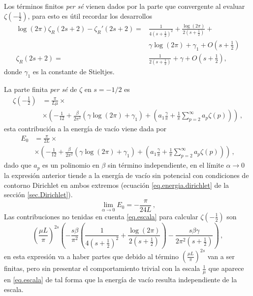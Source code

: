 Los términos finitos {\it per sé} vienen dados por la parte que convergente al evaluar $\zeta (-\frac{1}{2} )$, para esto es útil recordar los desarrollos
\begin{align}\label{cortar}
	\log (2 \pi) \zeta _R (2s+2) -
	\zeta _R ' (2s+2) = & 
	\frac{1}{4 \left( s + \frac{1}{2} \right) ^2} + 
	\frac{ \log (2 \pi ) }{2 \left( s + \frac{1}{2} \right) } + \\
	& \gamma \log (2 \pi ) + \gamma _1 + O \left( s + \frac{1}{2} \right) \\
	\zeta _R (2s+2) = &\frac{1}{2 \left( s + \frac{1}{2} \right)} + \gamma + O \left( s + \frac{1}{2} \right)
	 ,
\end{align}
donde $\gamma _1$ es la constante de Stieltjes.


La parte finita {\it per sé}  de $\zeta$ en $s=-1/2$ es 
\begin{align}\label{eq.escala}
 \zeta \left( -\frac{1}{2} \right) &= \frac{\pi}{L \mu} \times \\
 					& \times
					\left(
							- \frac{1}{12} +
							\frac{\beta}{2 \pi ^2} \left(
														\gamma \log (2 \pi)
														+ \gamma _1
														\right) +
							\left(
								a _1 \frac{\gamma}{\pi} +
								\frac{1}{\pi} \sum _{p=2} ^{\infty}
								a_p \zeta (p) 
								\right)
							\right) 
							\, ,
\end{align}
esta contribución a la energía de vacío viene dada por 
\begin{align}\label{eq.graficar}
\nonumber
 E _0 &= \frac{\pi}{2 L } \times \\
 					& \times
					\left(
							- \frac{1}{12} +
							\frac{\beta}{2 \pi ^2} \left(
														\gamma \log (2 \pi)
														+ \gamma _1
														\right) +
							\left(
							a _1\frac{\gamma}{\pi}
							+ \frac{1}{\pi} \sum _{p=2} ^{\infty}
								a_p \zeta (p) 
								\right)
							\right) 
							\, ,
\end{align}
dado que $a _p$ es un polinomio en $\beta$ sin término independiente, en el límite $\alpha \rightarrow 0$ la expresión anterior tiende a la energía de vacío sin potencial con condiciones de contorno Dirichlet en ambos extremos (ecuación \ref{eq.energia.dirichlet} de la sección \ref{sec.Dirichlet}).
\begin{equation}
\lim \limits_{\alpha \rightarrow 0} E _0 = 
		- \frac{\pi}{24 L}
\, ,
\end{equation}
Las contribuciones no tenidas en cuenta  \ref{eq.escala} para calcular $\zeta \left( - \frac{1}{2}\right)$ son
\begin{equation}\label{eq.terminos.div}
\left(
		\frac{\mu L}{\pi}
		\right) ^{2s}
\left(
		-\frac{s \beta}{\pi ^2}
			\left(
				\frac{1}{4 \left( s + \frac{1}{2}\right) ^2} +
				\frac{\log (2 \pi )}{2 \left( s + \frac{1}{2}\right)}
				\right)	-
				\frac{s \beta \gamma}{2 \pi ^2 \left( s + \frac{1}{2} \right) }
		\right)
\, ,
\end{equation}
en esta expresión va a haber partes que debido al término $ \left( \frac{\mu L}{\pi}\right) ^{2s}$ van a ser finitas, pero sin presentar el comportamiento trivial con la escala $\frac{1}{\mu}$ que aparece en \ref{eq.escala} de tal forma que la energía de vacío resulta independiente de la escala.

